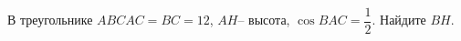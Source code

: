 \begin{ex}
	\begin{condition}
		 В треугольнике \( ABC AC = BC = 12 \), \( AH – \) высота,  \( \cos BAC=\dfrac{1}{2} \).  Найдите \( BH \).
	\end{condition}
\end{ex}